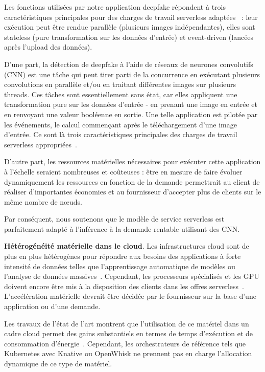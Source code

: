 Les fonctions utilisées par notre application deepfake répondent à trois caractéristiques principales pour des charges de travail serverless adaptées~\cite{cncf2018whitepaper} : leur exécution peut être rendue parallèle (plusieurs images indépendantes), elles sont stateless (pure transformation sur les données d'entrée) et event-driven (lancées après l'upload des données).

D'une part, la détection de deepfake à l'aide de réseaux de neurones convolutifs (CNN) est une tâche qui peut tirer parti de la concurrence en exécutant plusieurs convolutions en parallèle et/ou en traitant différentes images sur plusieurs threads. Ces tâches sont essentiellement sans état, car elles appliquent une transformation pure sur les données d'entrée - en prenant une image en entrée et en renvoyant une valeur booléenne en sortie. Une telle application est pilotée par les événements, le calcul commençant après le téléchargement d'une image d'entrée. Ce sont là trois caractéristiques principales des charges de travail serverless appropriées~\cite{cncf2018whitepaper}.

D'autre part, les ressources matérielles nécessaires pour exécuter cette application à l'échelle seraient nombreuses et coûteuses : être en mesure de faire évoluer dynamiquement les ressources en fonction de la demande permettrait au client de réaliser d'importantes économies et au fournisseur d'accepter plus de clients sur le même nombre de nœuds.

Par conséquent, nous soutenons que le modèle de service serverless est parfaitement adapté à l'inférence à la demande rentable utilisant des CNN.

\textbf{Hétérogénéité matérielle dans le cloud}. Les infrastructures cloud sont de plus en plus hétérogènes pour répondre aux besoins des applications à forte intensité de données telles que l'apprentissage automatique de modèles ou l'analyse de données massives~\cite{reissHeterogeneityDynamicityClouds}. Cependant, les processeurs spécialisés et les GPU doivent encore être mis à la disposition des clients dans les offres serverless~\cite{khandelwalTaureauDeconstructingServerless2020}. L'accélération matérielle devrait être décidée par le fournisseur sur la base d'une application ou d'une demande.

Les travaux de l'état de l'art montrent que l'utilisation de ce matériel dans un cadre cloud permet des gains substantiels en termes de temps d'exécution et de consommation d'énergie~\cite{10.1145/3369583.3392679, 9195730}. Cependant, les orchestrateurs de référence tels que Kubernetes avec Knative ou OpenWhisk ne prennent pas en charge l'allocation dynamique de ce type de matériel.

